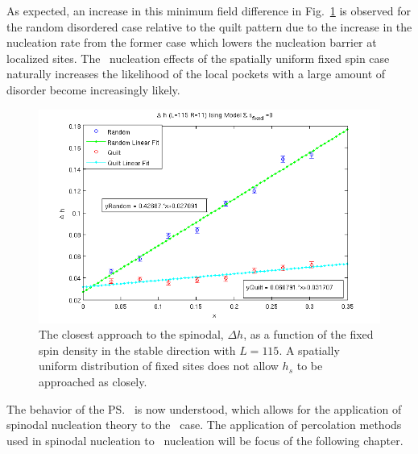 As expected, an increase in this minimum field difference in Fig.~\ref{fig:spinodalshift}  is observed for the random disordered case relative to the quilt pattern due to the increase in the nucleation rate from the former case which lowers the nucleation barrier  at  localized sites. The \het\ nucleation effects of the  spatially uniform fixed spin case naturally increases the likelihood of the local pockets with a large amount of disorder become increasingly likely. 
\begin{figure}[!h]
    \centering
      \includegraphics[scale=0.75]{Figures/spinodal/BalancedL115.png}
    \caption{The closest approach to the spinodal, $\Delta h$, as a function of the fixed spin density  in the stable direction with $L=115$. A spatially uniform distribution of fixed sites does not allow  $h_s$ to be approached as closely. }
  \label{fig:spinodalshift}
\end{figure}%


The behavior of the \ps\ is now understood, which allows for the application of spinodal nucleation theory to the \het\ case. The application of percolation methods used in spinodal nucleation to \het\ nucleation will be focus of the following chapter. 
